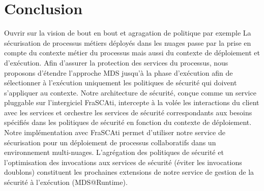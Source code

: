 \documentclass[runningheads,a4paper]{llncs}
\begin{document}

\section{Conclusion}
Ouvrir sur la vision de bout en bout et agragation de politique par exemple
\label{sec:end}
La s\'ecurisation de processus m\'etiers d\'eploy\'es dans les nuages passe par la prise en compte du contexte m\'etier du processus mais aussi du contexte de d\'eploiement et d’ex\'ecution. Afin d’assurer la protection des services du processus, nous proposons d’\'etendre l'approche MDS jusqu’\`a	 la phase d’ex\'ecution afin de s\'electionner \`a	 l’ex\'ecution uniquement les politiques de s\'ecurit\'e qui doivent s’appliquer au contexte. Notre architecture de s\'ecurit\'e, conçue comme un service pluggable sur l'intergiciel FraSCAti, intercepte \`a	 la vol\'ee les interactions du client avec les services et orchestre les services de s\'ecurit\'e correspondants aux besoins sp\'ecifi\'es dans les politiques de s\'ecurit\'e en fonction du contexte de d\'eploiement. Notre impl\'ementation avec FraSCAti permet d’utiliser notre service de s\'ecurisation pour un d\'eploiement de processus collaboratifs dans un environnement multi-nuages. L'agr\'egation des politiques de s\'ecurit\'e et l'optimisation des invocations aux services de s\'ecurit\'e (\'eviter les invocations doublons) constituent les prochaines extensions de notre service de gestion de la s\'ecurit\'e \`a	 l’ex\'ecution (MDS@Runtime).
\end{document}
